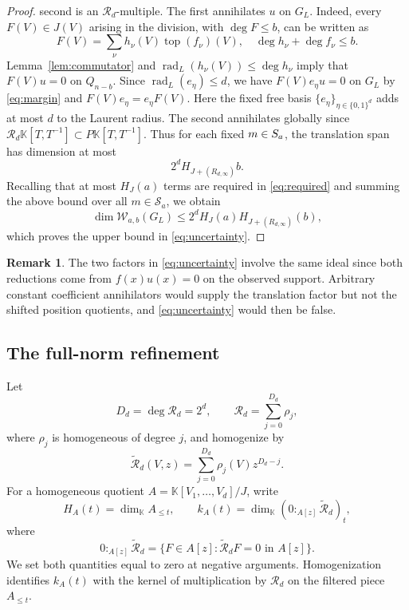 \documentclass[11pt,reqno]{amsart}
\newcommand\K{\ensuremath{\mathbb{K}}}
\theoremstyle{definition}
\newtheorem{remark}[theorem]{Remark}
\theoremstyle{plain}
\numberwithin{equation}{section}
\begin{document}
\begin{proof}
second is an $\mathcal R_d$-multiple. The first annihilates
$u$ on $G_L$. Indeed, every $F(V)\in J(V)$ arising in the division, with
$\deg F\le b$, can be written as
\begin{equation*}
    F(V)=\sum_\nu h_\nu(V)\operatorname{top}(f_\nu)(V),
\quad
\deg h_\nu+\deg f_\nu\le b.
\end{equation*}
Lemma~\ref{lem:commutator} and
$\operatorname{rad}_L(h_\nu(V))\le\deg h_\nu$ imply that
$F(V)u=0$ on $Q_{n-b}$. Since
$\operatorname{rad}_L(e_\eta)\le d$, we have
$F(V)e_\eta u=0$ on $G_L$ by \eqref{eq:margin} and $F(V)e_\eta=e_\eta F(V)$.
Here the fixed free basis $\lbrace e_\eta\rbrace_{\eta\in \{0, 1\}^d}$ adds
at most $d$ to the Laurent radius.  The
second annihilates
globally since $\mathcal {R}_d\K[T,T^{-1}]\subset P\K[T,T^{-1}]$.
Thus for each fixed $m\in\mathcal \mathcal{S}_a$, the translation span has
dimension at most
\begin{equation*}
        2^dH_{J+(R_{d,\infty})}b.
\end{equation*}
Recalling that at most $H_J(a)$ terms are required in \eqref{eq:required} and summing the above bound over all $m\in\mathcal S_a$, we obtain
\[
    \dim\mathcal W_{a,b}(G_L)
    \le
    2^dH_J(a)H_{J+(R_{d,\infty})}(b),
\]
which proves the upper bound in \eqref{eq:uncertainty}.
\end{proof}

\begin{remark}
The two factors in \eqref{eq:uncertainty} involve the same ideal since both reductions
come from $f(x)u(x)=0$ on the observed support.
Arbitrary constant coefficient annihilators would supply the translation factor but not the shifted position quotients, and \eqref{eq:uncertainty} would then be
false.
\end{remark}


\subsection{The full-norm refinement}


Let
\[
        D_d=\deg\mathcal R_d=2^d,
        \qquad \mathcal R_d=\sum_{j=0}^{D_d}\rho_j,
\]
where $\rho_j$ is homogeneous of degree $j$, and homogenize by
\begin{equation}\label{eq:inset-z}
 \widetilde{\mathcal R}_d(V,z)
   =\sum_{j=0}^{D_d}\rho_j(V)z^{D_d-j}.
\end{equation}
For a homogeneous quotient $A=\K[V_1,\ldots,V_d]/J$, write
\[
 H_A(t)=\dim_\K A_{\le t},\qquad
 k_A(t)=\dim_\K(0:_{A[z]}\widetilde{\mathcal{R} }_d)_t,
\]
where
\begin{equation*}
    0:_{A[z]} \widetilde{\mathcal{R}}_d =\lbrace F\in A[z]: \widetilde{\mathcal{R}}_d F=0 \text{ in } A[z] \rbrace.
\end{equation*}
We set both quantities equal to zero at negative arguments.
Homogenization identifies $k_A(t)$ with the kernel of multiplication by
$\mathcal R_d$ on the filtered piece $A_{\le t}$.
\end{document}
